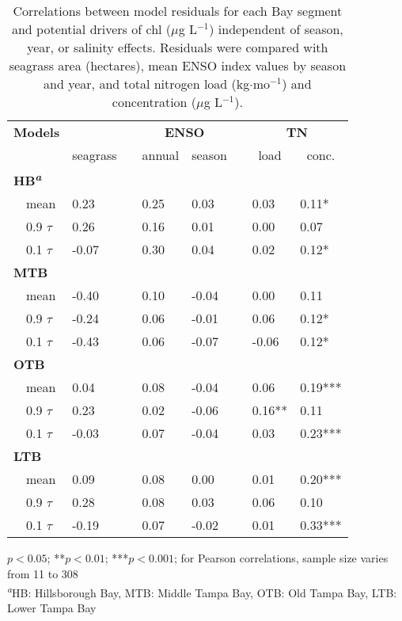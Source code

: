 \documentclass{svjour3}\usepackage[]{graphicx}\usepackage[]{color}
\newcommand{\mugl}{$\mu$g L$^{-1}$}
\begin{document}
%
\begin{table}[!tbp]
\caption{Correlations between model residuals for each Bay segment and potential drivers of \ac{chl} (\mugl) independent of season, year, or salinity effects. Residuals were compared with seagrass area (hectares), mean ENSO index values by season and year, and total nitrogen load (kg$\cdot$mo$^{-1}$) and concentration (\mugl).\label{tab:cormat}} 
\begin{center}
\begin{tabular}{llcllcll}
\hline\hline
\multicolumn{1}{l}{\bfseries Models}&\multicolumn{1}{c}{\bfseries }&\multicolumn{1}{c}{\bfseries }&\multicolumn{2}{c}{\bfseries ENSO}&\multicolumn{1}{c}{\bfseries }&\multicolumn{2}{c}{\bfseries TN}\tabularnewline
\cline{4-5} \cline{7-8}
\multicolumn{1}{l}{}&\multicolumn{1}{c}{seagrass}&\multicolumn{1}{c}{}&\multicolumn{1}{c}{annual}&\multicolumn{1}{c}{season}&\multicolumn{1}{c}{}&\multicolumn{1}{c}{load}&\multicolumn{1}{c}{conc.}\tabularnewline
\hline
{\bfseries HB\textsuperscript{\textit{a}}}&&&&&&&\tabularnewline
~~mean&0.23 &&0.25 &0.03 &&0.03 &0.11*\tabularnewline
~~0.9 $\tau$&0.26 &&0.16 &0.01 &&0.00 &0.07 \tabularnewline
~~0.1 $\tau$&-0.07 &&0.30 &0.04 &&0.02 &0.12*\tabularnewline
\hline
{\bfseries MTB}&&&&&&&\tabularnewline
~~mean&-0.40 &&0.10 &-0.04 &&0.00 &0.11 \tabularnewline
~~0.9 $\tau$&-0.24 &&0.06 &-0.01 &&0.06 &0.12*\tabularnewline
~~0.1 $\tau$&-0.43 &&0.06 &-0.07 &&-0.06 &0.12*\tabularnewline
\hline
{\bfseries OTB}&&&&&&&\tabularnewline
~~mean&0.04 &&0.08 &-0.04 &&0.06 &0.19***\tabularnewline
~~0.9 $\tau$&0.23 &&0.02 &-0.06 &&0.16**&0.11 \tabularnewline
~~0.1 $\tau$&-0.03 &&0.07 &-0.04 &&0.03 &0.23***\tabularnewline
\hline
{\bfseries LTB}&&&&&&&\tabularnewline
~~mean&0.09 &&0.08 &0.00 &&0.01 &0.20***\tabularnewline
~~0.9 $\tau$&0.28 &&0.08 &0.03 &&0.06 &0.10 \tabularnewline
~~0.1 $\tau$&-0.19 &&0.07 &-0.02 &&0.01 &0.33***\tabularnewline
\hline
\end{tabular}
\end{center}
\footnotesize *$p<0.05$; **$p<0.01$; ***$p<0.001$; for Pearson correlations, sample size varies from 11 to 308\\\textsuperscript{\textit{a}}HB: Hillsborough Bay, MTB: Middle Tampa Bay, OTB: Old Tampa Bay, LTB: Lower Tampa Bay\end{table}
\end{document}
